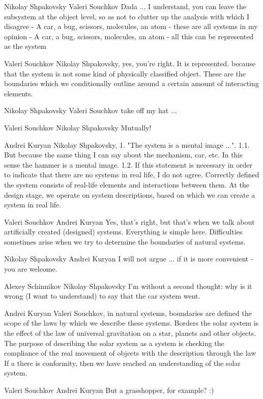 \documentclass[11pt,a4paper]{article}
\begin{document}
Nikolay Shpakovsky Valeri Souchkov Dada ... I understand, you can leave the
subsystem at the object level, so as not to clutter up the analysis with which
I disagree - A car, a bug, scissors, molecules, an atom - these are all
systems in my opinion - A car, a bug, scissors, molecules, an atom - all this
can be represented as the system

Valeri Souchkov Nikolay Shpakovsky, yes, you're right. It is
represented. because that the system is not some kind of physically classified
object. These are the boundaries which we conditionally outline around a
certain amount of interacting elements.

Nikolay Shpakovsky Valeri Souchkov take off my hat ...

Valeri Souchkov Nikolay Shpakovsky Mutually!

Andrei Kuryan Nikolay Shpakovsky, 1. "The system is a mental image
...". 1.1. But because the same thing I can say about the mechanism, car,
etc. In this sense the hammer is a mental image. 1.2. If this statement is
necessary in order to indicate that there are no systems in real life, I do
not agree. Correctly defined the system consists of real-life elements and
interactions between them. At the design stage, we operate on system
descriptions, based on which we can create a system in real life.

Valeri Souchkov Andrei Kuryan Yes, that's right, but that's when we talk about
artificially created (designed) systems. Everything is simple
here. Difficulties sometimes arise when we try to determine the boundaries of
natural systems.

Nikolay Shpakovsky Andrei Kuryan I will not argue ... if it is more convenient
- you are welcome.

Alexey Schinnikov Nikolay Shpakovsky I'm without a second thought: why is it
wrong (I want to understand) to say that the car system went.

Andrei Kuryan Valeri Souchkov, in natural systems, boundaries are defined the
scope of the laws by which we describe these systems. Borders the solar system
is the effect of the law of universal gravitation on a star, planets and other
objects. The purpose of describing the solar system as a system is checking
the compliance of the real movement of objects with the description through
the law If a there is conformity, then we have reached an understanding of the
solar system.

Valeri Souchkov Andrei Kuryan But a grasshopper, for example? :)
\end{document}
